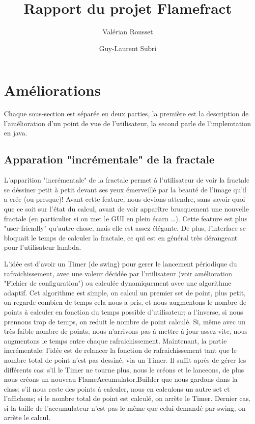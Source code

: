\documentclass[a4paper]{article}
\author{Valérian Rousset \and Guy-Laurent Subri}
\title{Rapport du projet Flamefract}
\begin{document}
\maketitle

\section*{Améliorations}
Chaque sous-section est séparée en deux parties, la première est la description de l'amélioration d'un point de vue de l'utilisateur, la second parle de l'implemtation en java.

\subsection*{Apparation "incrémentale" de la fractale}
L'apparition "incrémentale" de la fractale permet à l'utilisateur de voir la fractale se déssiner petit à petit devant ses yeux émerveillé par la beauté de l'image qu'il a crée (ou presque)! Avant cette feature, nous devions attendre, sans savoir quoi que ce soit sur l'état du calcul, avant de voir apparître brusquement une nouvelle fractale (en particulier si on met le GUI en plein écarn \ldots). Cette feature est plus "user-friendly" qu'autre chose, mais elle est assez élégante. De plus, l'interface se bloquait le temps de calculer la fractale, ce qui est en général très dérangeant pour l'utilisateur lambda.

L'idée est d'avoir un Timer (de swing) pour gerer le lancement périodique du rafraichissement, avec une valeur décidée par l'utilisateur (voir amélioration "Fichier de configuration") ou calculée dynamiquement avec une algorithme adaptif. Cet algorithme est simple, on calcul un premier set de point, plus petit, on regarde combien de temps cela nous a pris, et nous augmentons le nombre de points à calculer en fonction du temps possible d'utilisateur; a l'inverse, si nous prennons trop de temps, on reduit le nombre de point calculé. Si, même avec un très faible nombre de points, nous n'arrivons pas à mettre à jour assez vite, nous augmentons le temps entre chaque rafraichissement. Maintenant, la partie incrémentale: l'idée est de relancer la fonction de rafraichissement tant que le nombre total de point n'est pas dessiné, via un Timer. Il suffit après de gérer les différents cas: s'il le Timer ne tourne plus, nous le créons et le lanceons, de plus nous créons un nouveau FlameAccumulator.Builder que nous gardons dans la class; s'il nous reste des points à calculer, nous en calculons un autre set et l'affichons; si le nombre total de point est calculé, on arrète le Timer. Dernier cas, si la taille de l'accumulateur n'est pas le même que celui demandé par swing, on arrète le calcul.
\end{document}
